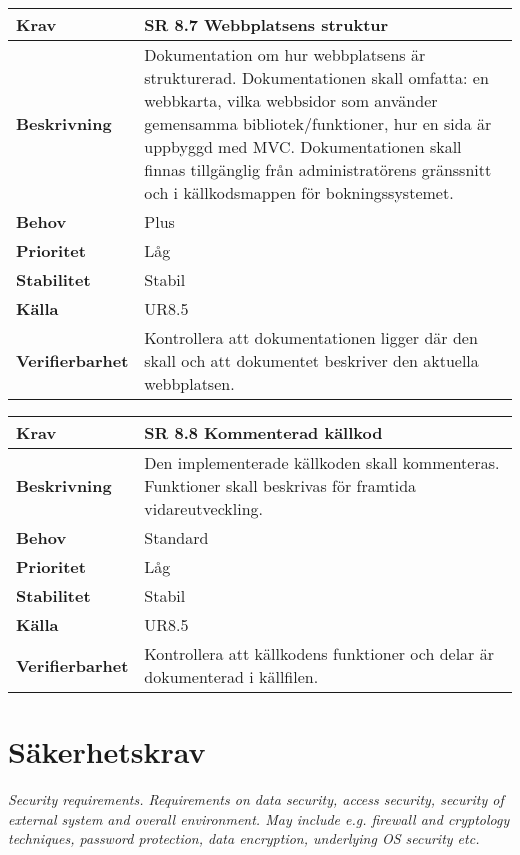 \documentclass[a4paper, twoside, 11pt, titlepage]{article}
\begin{document}
	\begin{tabular} { p{2.6cm} p{12.5cm} }
		\hline
		\sffamily\textbf{Krav} & \sffamily\textbf{SR 8.7 Webbplatsens struktur } \\
		\hline
		\sffamily\textbf{Beskrivning} & Dokumentation om hur webbplatsens är strukturerad. Dokumentationen skall omfatta: en webbkarta, vilka webbsidor som använder gemensamma bibliotek/funktioner, hur en sida är uppbyggd med MVC. Dokumentationen skall finnas tillgänglig från administratörens gränssnitt och i  källkodsmappen för bokningssystemet.  \\
		\hline
		\sffamily\textbf{Behov} & Plus  \\
		\hline
		\sffamily\textbf{Prioritet} & Låg  \\
		\hline
		\sffamily\textbf{Stabilitet} & Stabil  \\
		\hline
		\sffamily\textbf{Källa} & UR8.5  \\
		\hline
		\sffamily\textbf{Verifierbarhet} & Kontrollera att dokumentationen ligger där den skall och att dokumentet beskriver den aktuella webbplatsen.  \\
		\hline
	\end{tabular}
	\vspace{6mm}

	\begin{tabular} { p{2.6cm} p{12.5cm} }
		\hline
		\sffamily\textbf{Krav} & \sffamily\textbf{SR 8.8 Kommenterad källkod } \\
		\hline
		\sffamily\textbf{Beskrivning} & Den implementerade källkoden skall kommenteras. Funktioner skall beskrivas för framtida vidareutveckling.  \\
		\hline
		\sffamily\textbf{Behov} & Standard  \\
		\hline
		\sffamily\textbf{Prioritet} & Låg  \\
		\hline
		\sffamily\textbf{Stabilitet} & Stabil  \\
		\hline
		\sffamily\textbf{Källa} & UR8.5  \\
		\hline
		\sffamily\textbf{Verifierbarhet} & Kontrollera att källkodens funktioner och delar är dokumenterad i källfilen.  \\
		\hline
	\end{tabular}


\clearpage
\section{Säkerhetskrav}


\emph{Security requirements. Requirements on data security, access security, security of external system and overall environment. May include e.g. firewall and cryptology techniques, password protection, data encryption, underlying OS security etc.}
\end{document}
